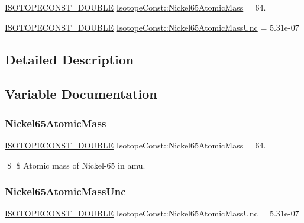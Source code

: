 \begin{DoxyCompactItemize}
\item 
\mbox{\hyperlink{group___isotope_const-_macros_ga8f45a7272ce02c0b4c65c44636ed719a}{I\+S\+O\+T\+O\+P\+E\+C\+O\+N\+S\+T\+\_\+\+D\+O\+U\+B\+LE}} \mbox{\hyperlink{group___isotope_const-_nickel-_ni65_gaeccf7335c3aaf2917ca6e28b5efc2fa3}{Isotope\+Const\+::\+Nickel65\+Atomic\+Mass}} = 64.
\item 
\mbox{\hyperlink{group___isotope_const-_macros_ga8f45a7272ce02c0b4c65c44636ed719a}{I\+S\+O\+T\+O\+P\+E\+C\+O\+N\+S\+T\+\_\+\+D\+O\+U\+B\+LE}} \mbox{\hyperlink{group___isotope_const-_nickel-_ni65_ga274cc2f11c42f4a250feed64626c3500}{Isotope\+Const\+::\+Nickel65\+Atomic\+Mass\+Unc}} = 5.\+31e-\/07
\end{DoxyCompactItemize}


\subsection{Detailed Description}


\subsection{Variable Documentation}
\mbox{\label{group___isotope_const-_nickel-_ni65_gaeccf7335c3aaf2917ca6e28b5efc2fa3}} 
\subsubsection{\texorpdfstring{Nickel65\+Atomic\+Mass}{Nickel65AtomicMass}}
{\footnotesize\ttfamily \mbox{\hyperlink{group___isotope_const-_macros_ga8f45a7272ce02c0b4c65c44636ed719a}{I\+S\+O\+T\+O\+P\+E\+C\+O\+N\+S\+T\+\_\+\+D\+O\+U\+B\+LE}} Isotope\+Const\+::\+Nickel65\+Atomic\+Mass = 64.}

\$ \$ Atomic mass of Nickel-\/65 in amu. \mbox{\label{group___isotope_const-_nickel-_ni65_ga274cc2f11c42f4a250feed64626c3500}} 
\subsubsection{\texorpdfstring{Nickel65\+Atomic\+Mass\+Unc}{Nickel65AtomicMassUnc}}
{\footnotesize\ttfamily \mbox{\hyperlink{group___isotope_const-_macros_ga8f45a7272ce02c0b4c65c44636ed719a}{I\+S\+O\+T\+O\+P\+E\+C\+O\+N\+S\+T\+\_\+\+D\+O\+U\+B\+LE}} Isotope\+Const\+::\+Nickel65\+Atomic\+Mass\+Unc = 5.\+31e-\/07}

